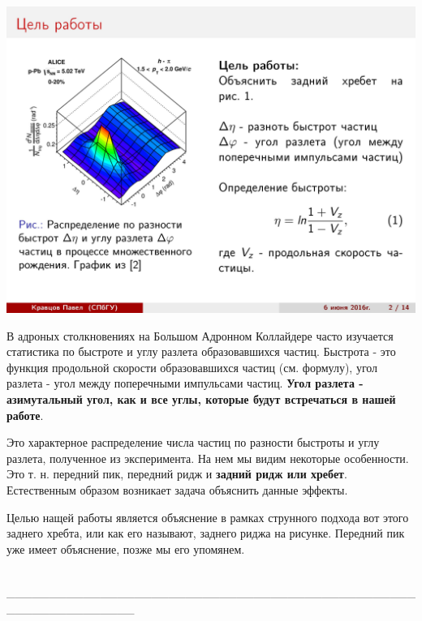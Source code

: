 \documentclass[14pt]{article}
\renewcommand{\line}{\\ \_\_\_\_\_\_\_\_\_\_\_\_\_\_\_\_\_\_\_\_\_\_\_\_\_\_\_\_\_\_\_\_\_\_\_\_\_\_\_\_\_\_\_\_\_\_\_\_\_\_\_\_\_\_\_\_\_\_\_\_\_\_\_ \\ }
\begin{document}
\begin{minipage}[h]{0.35\linewidth}
\includegraphics[width=1\linewidth]{page-02.jpg}
\end{minipage}
\begin{minipage}[h]{0.60\linewidth}
В адроных столкновениях на Большом Адронном Коллайдере часто изучается статистика по быстроте и  углу разлета образовавшихся частиц. Быстрота - это функция продольной скорости образовавшихся частиц (см. формулу), угол разлета - угол между поперечными импульсами частиц. {\bf Угол разлета - азимутальный угол, как и все углы, которые будут встречаться в нашей работе}. 

Это характерное распределение числа частиц по разности быстроты и углу разлета, полученное из эксперимента. На нем мы видим некоторые особенности. Это т. н. передний пик, передний ридж и {\bfseries задний ридж или хребет}. Естественным образом возникает задача объяснить данные эффекты.

Целью нащей работы является объяснение в рамках струнного подхода вот этого заднего хребта, или как его называют, заднего риджа на рисунке. Передний пик уже имеет объяснение, позже мы его упомянем.
\end{minipage}
\line
\end{document}
